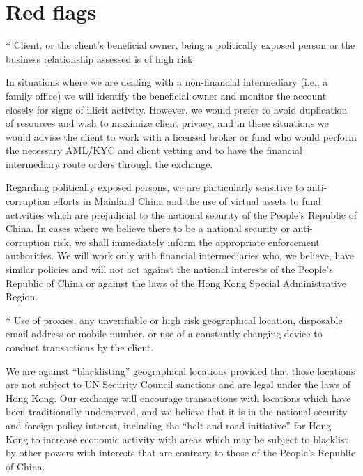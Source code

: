 
\section{Red flags}

* Client, or the client’s beneficial owner, being a politically
exposed person or the business relationship assessed is of high risk

In situations where we are dealing with a non-financial intermediary
(i.e., a family office) we will identify the beneficial owner and
monitor the account closely for signs of illicit activity.  However,
we would prefer to avoid duplication of resources and wish to maximize
client privacy, and in these situations we would advise the client to
work with a licensed broker or fund who would perform the necessary
AML/KYC and client vetting and to have the financial intermediary
route orders through the exchange.

Regarding politically exposed persons, we are particularly
sensitive to anti-corruption efforts in Mainland China and the use of
virtual assets to fund activities which are prejudicial to the
national security of the People's Republic of China.  In cases where
we believe there to be a national security or anti-corruption risk, we
shall immediately inform the appropriate enforcement authorities.  We
will work only with financial intermediaries who, we believe, have
similar policies and will not act against the national interests of
the People's Republic of China or against the laws of the Hong Kong
Special Administrative Region.

* Use of proxies, any unverifiable or high risk geographical location,
disposable email address or mobile number, or use of a constantly
changing device to conduct transactions by the client.

We are against ``blacklisting'' geographical locations provided that
those locations are not subject to UN Security Council sanctions and
are legal under the laws of Hong Kong.  Our exchange will encourage
transactions with locations which have been traditionally underserved,
and we believe that it is in the national security and foreign policy
interest, including the ``belt and road initiative'' for Hong Kong to
increase economic activity with areas which may be subject to
blacklist by other powers with interests that are contrary to those of
the People's Republic of China.

